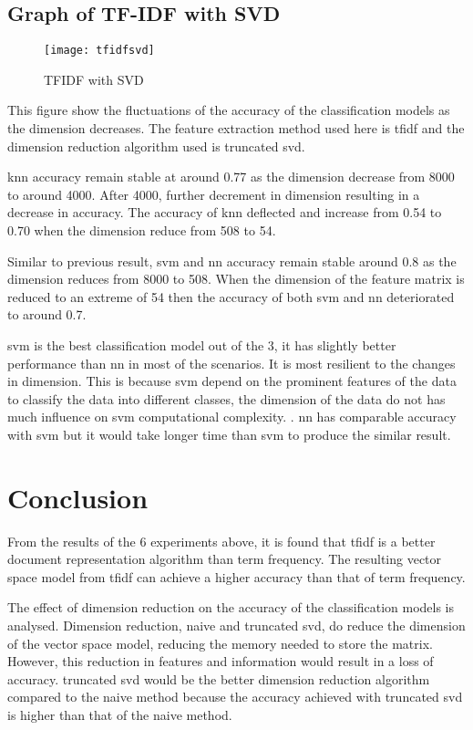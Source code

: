 \subsection{Graph of TF-IDF with SVD}
\begin{figure} [H]
	\centering
	\texttt{[image: tfidfsvd]}
	\caption{TFIDF with SVD}
	\label{fig:tfidfSVD}
\end{figure}

This figure show the fluctuations of the accuracy of the classification models as the dimension decreases. The feature extraction method used here is \ac{tfidf} and the dimension reduction algorithm used is truncated \ac{svd}.

\Ac{knn} accuracy remain stable at around 0.77 as the dimension decrease from 8000 to around 4000. After 4000, further decrement in dimension resulting in a decrease in accuracy. The accuracy of \ac{knn} deflected and increase from 0.54 to 0.70 when the dimension reduce from 508 to 54.

Similar to previous result, \ac{svm} and \ac{nn} accuracy remain stable around 0.8 as the dimension reduces from 8000 to 508. When the dimension of the feature matrix is reduced to an extreme of 54 then the accuracy of both \ac{svm} and \ac{nn} deteriorated to around 0.7.

\Ac{svm} is the best classification model out of the 3, it has slightly better performance than \ac{nn} in most of the scenarios. It is most resilient to the changes in dimension. This is because \ac{svm} depend on the prominent features of the data to classify the data into different classes, the dimension of the data do not has much influence on \ac{svm} computational complexity. \cite{dimRedCat}. \Ac{nn} has comparable accuracy with \ac{svm} but it would take longer time than \ac{svm} to produce the similar result.\\


\section{Conclusion}
From the results of the 6 experiments above, it is found that \ac{tfidf} is a better document representation algorithm than term frequency. The resulting vector space model from \ac{tfidf} can achieve a higher accuracy than that of term frequency. 

The effect of dimension reduction on the accuracy of the classification models is analysed. Dimension reduction, naive and truncated \ac{svd}, do reduce the dimension of the vector space model, reducing the memory needed to store the matrix. However, this reduction in features and information would result in a loss of accuracy. truncated \ac{svd} would be the better dimension reduction algorithm compared to the naive method because the accuracy achieved with truncated \ac{svd} is higher than that of the naive method.

